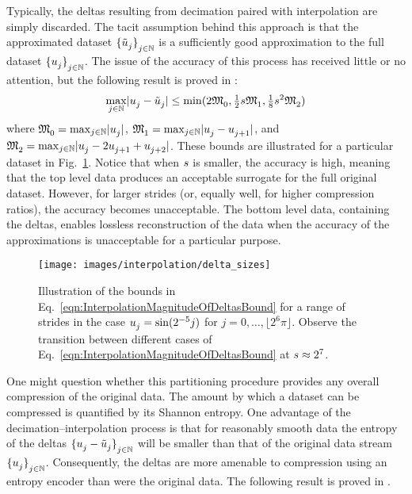 Typically, the deltas resulting from decimation paired with interpolation are simply discarded.
The tacit assumption behind this approach is that the approximated dataset \(\Data[approx]\) is a sufficiently good approximation to the full dataset \(\Data\).
The issue of the accuracy of this process has received little or no attention, but the following result is proved in \cite{AinsworthWhitneyKlasky}:
\begin{equation}
\max_{j\in\NN}\lvert\InterpolationError{j}\rvert \leq \min(
2\MaximumDifferenceGlobal{0},
\tfrac{1}{2}\stride\MaximumDifferenceGlobal{1},
\tfrac{1}{8}\stride^{2}\MaximumDifferenceGlobal{2}
)
\label{eqn:InterpolationMagnitudeOfDeltasBound}
\end{equation}
where \(\MaximumDifferenceGlobal{0}=\max_{j\in\NN}\lvert\Datum{j}\rvert\), \(\MaximumDifferenceGlobal{1}=\max_{j\in\NN}\lvert\Datum{j}-\Datum{j+1}\rvert\), and \(\MaximumDifferenceGlobal{2}=\max_{j\in\NN}\lvert\Datum{j}-2\Datum{j+1}+\Datum{j+2}\rvert\).
These bounds are illustrated for a particular dataset in Fig.~\ref{fig:InterpolationDeltaMagnitudeExample}.
Notice that when \(s\) is smaller, the accuracy is high, meaning that the top level data produces an acceptable surrogate for the full original dataset.
However, for larger strides (or, equally well, for higher compression ratios), the accuracy becomes unacceptable.
The bottom level data, containing the deltas, enables lossless reconstruction of the data when the accuracy of the approximations is unacceptable for a particular purpose.
\begin{figure}[ht]
\centering
\texttt{[image: images/interpolation/delta\_sizes]}
\caption{%
Illustration of the bounds in Eq.~\eqref{eqn:InterpolationMagnitudeOfDeltasBound} for a range of strides in the case \(\Datum{j}=\sin(2^{-5}j)\) for \(j=0,\ldots,\lfloor2^{6}\pi\rfloor\).
Observe the transition between different cases of Eq.~\eqref{eqn:InterpolationMagnitudeOfDeltasBound} at \(s\approx2^{7}\).%
}
\label{fig:InterpolationDeltaMagnitudeExample}
\end{figure}

One might question whether this partitioning procedure provides any overall compression of the original data.
The amount by which a dataset can be compressed is quantified by its Shannon entropy.
One advantage of the decimation--interpolation process is that for reasonably smooth data the entropy of the deltas \(\InterpolationErrors\) will be smaller than that of the original data stream \(\Data\).
Consequently, the deltas are more amenable to compression using an entropy encoder than were the original data.
The following result is proved in \cite{AinsworthWhitneyKlasky}.

